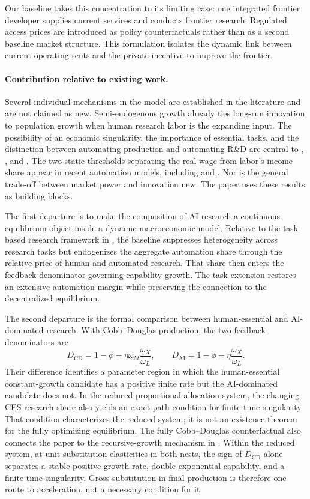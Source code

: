 Our baseline takes this concentration to its limiting case: one integrated frontier
developer supplies current services and conducts frontier research. Regulated access
prices are introduced as policy counterfactuals rather than as a second baseline
market structure. This formulation isolates the dynamic link between current
operating rents and the private incentive to improve the frontier.

\paragraph{Contribution relative to existing work.}
Several individual mechanisms in the model are established in the literature and
are not claimed as new. Semi-endogenous growth already ties long-run innovation to
population growth when human research labor is the expanding input. The possibility
of an economic singularity, the importance of essential tasks, and the distinction
between automating production and automating R\&D are central to
\citet{aghionjonesjones2019}, \citet{nordhaus2021}, and
\citet{trammellkorinek2023}. The two static thresholds separating the real wage from
labor's income share appear in recent automation models, including
\citet{autorkausik2026} and \citet{yango2026}. Nor is the general trade-off between
market power and innovation new. The paper uses these results as building blocks.

The first departure is to make the composition of AI research a continuous
equilibrium object inside a dynamic macroeconomic model. Relative to the task-based
research framework in \citet{jones2025rd}, the baseline suppresses heterogeneity
across research tasks but endogenizes the aggregate automation share through the
relative price of human and automated research. That share then enters the feedback
denominator governing capability growth. The task extension restores an extensive
automation margin while preserving the connection to the decentralized equilibrium.

The second departure is the formal comparison between human-essential and
AI-dominated research. With Cobb--Douglas production, the two feedback denominators
are
\[
    D_{\mathrm{CD}}
    =1-\phi-\eta\omega_M\frac{\omega_X}{\omega_L},
    \qquad
    D_{\mathrm{AI}}
    =1-\phi-\eta\frac{\omega_X}{\omega_L}.
\]
Their difference identifies a parameter region in which the human-essential
constant-growth candidate has a positive finite rate but the AI-dominated candidate
does not. In the reduced proportional-allocation system, the changing CES research
share also yields an exact path condition for finite-time singularity. That condition
characterizes the reduced system; it is not an existence theorem for the fully
optimizing equilibrium.
The fully Cobb--Douglas counterfactual also connects the paper to the recursive-growth
mechanism in \citet{aghionjonesjones2019}. Within the reduced system, at unit
substitution elasticities in both nests, the sign of $D_{\mathrm{CD}}$ alone
separates a stable positive growth rate,
double-exponential capability, and a finite-time singularity. Gross substitution in
final production is therefore one route to acceleration, not a necessary condition
for it.

